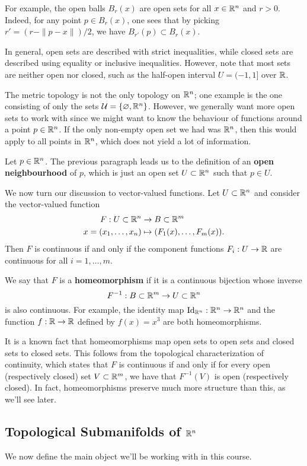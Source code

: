 For example, the open balls $B_r(x)$ are open sets for all 
$x \in \mathbb{R}^n$ and $r > 0$. Indeed, for any point $p \in 
B_r(x)$, one sees that by picking $r' = (r - \|p - x\|)/2$, 
we have $B_{r'}(p) \subset B_r(x)$. 

In general, open sets are described with strict inequalities, while closed 
sets are described using equality or inclusive inequalities. However, note 
that most sets are neither open nor closed, such as the half-open interval 
$U = (-1, 1]$ over $\mathbb{R}$. 

The metric topology is not the only topology on $\mathbb{R}^n$; one example is 
the one consisting of only the sets ${\cal U} = \{\varnothing, \mathbb{R}^n\}$.
However, we generally want more open sets to work with since we might want to 
know the behaviour of functions around a point $p \in \mathbb{R}^n$. If the 
only non-empty open set we had was $\mathbb{R}^n$, then this would apply to all points 
in $\mathbb{R}^n$, which does not yield a lot of information. 

Let $p \in \mathbb{R}^n$. The previous paragraph leads us to the definition of an 
{\bf open neighbourhood} of $p$, which is just an open set $U \subset \mathbb{R}^n$ 
such that $p \in U$. 

We now turn our discussion to vector-valued functions. Let $U \subset \mathbb{R}^n$ 
and consider the vector-valued function 
\begin{align*}
    F : U \subset \mathbb{R}^n &\to B \subset \mathbb{R}^m \\ 
    x = (x_1, \dots, x_n) &\mapsto (F_1(x), \dots, F_m(x)). 
\end{align*}
Then $F$ is continuous if and only if the component functions 
$F_i : U \to \mathbb{R}$ are continuous for all $i = 1, \dots, m$. 

We say that $F$ is a {\bf homeomorphism} if it is a continuous bijection 
whose inverse 
\[ F^{-1} : B \subset \mathbb{R}^m \to U \subset \mathbb{R}^n \] 
is also continuous. For example, the identity map $\operatorname{Id}_{\mathbb{R}^n} : \mathbb{R}^n \to \mathbb{R}^n$ 
and the function $f : \mathbb{R} \to \mathbb{R}$ defined by $f(x) = x^3$ are both homeomorphisms. 

It is a known fact that homeomorphisms map open sets to open sets and closed 
sets to closed sets. This follows from the topological characterization 
of continuity, which states that $F$ is continuous if and only if for 
every open (respectively closed) set $V \subset \mathbb{R}^m$, we have that 
$F^{-1}(V)$ is open (respectively closed). In fact, homeomorphisms preserve 
much more structure than this, as we'll see later. 

\subsection{Topological Submanifolds of $\mathbb{R}^n$}\label{subsec:1.2}
We now define the main object we'll be working with in this course.


